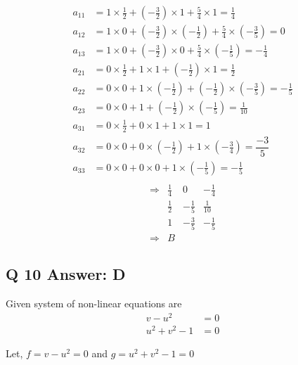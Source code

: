 \documentclass[a4paper,11pt]{article}
\begin{document}
\begin{align*}
    a_{11} &= 1 \times \frac{1}{2} + \left(-\frac{3}{2}\right) \times 1 + \frac{5}{4} \times 1 = \frac{1}{4}   \\
    a_{12} &= 1 \times 0 +  \left(-\frac{3}{2}\right) \times \left(-\frac{1}{2}\right) + \frac{5}{4} \times \left(-\frac{3}{5}\right) = 0 \\
    a_{13} &=  1 \times 0 + \left(-\frac{3}{2}\right) \times 0 + \frac{5}{4} \times \left(-\frac{1}{5}\right) = - \frac{1}{4} \\
    a_{21} &= 0 \times \frac{1}{2} + 1 \times 1 + \left(-\frac{1}{2}\right) \times 1 = \frac{1}{2}   \\
    a_{22} &=  0 \times 0 + 1 \times \left(-\frac{1}{2}\right) + \left(-\frac{1}{2}\right) \times \left(-\frac{3}{5}\right) = -\frac{1}{5} \\
    a_{23} &= 0 \times 0 + 1 + \left(-\frac{1}{2}\right) \times \left(-\frac{1}{5}\right) = \frac{1}{10}   \\
    a_{31} &=  0 \times \frac{1}{2} + 0 \times 1 + 1 \times 1 = 1 \\
    a_{32} &=  0 \times 0 + 0 \times \left(-\frac{1}{2}\right) + 1 \times \left(-\frac{3}{4}\right) = \dfrac{-3}{5} \\
    a_{33} &= 0 \times 0 + 0 \times 0 + 1 \times \left(-\frac{1}{5}\right) = -\frac{1}{5}   \\
\end{align*}
\[\begin{array}{rrrr}
    \Rightarrow  & \frac{1}{4} & 0 & -\frac{1}{4} \\ [2mm]
                 & \frac{1}{2} & -\frac{1}{5} & \frac{1}{10} \\ [2mm]
                 & 1 & -\frac{3}{5} & -\frac{1}{5} \\ [5mm]
    \Rightarrow & \boxed{B} & &
\end{array}\]

\clearpage
\subsection*{Q 10 Answer: D}

Given system of non-linear equations are 
\begin{align*}
    v - u^2 &= 0 \\
    u^2 + v^2 - 1 &= 0
\end{align*}



Let, \( f = v - u^2 = 0 \) and \( g = u^2 + v^2 - 1 = 0 \)
\end{document}
